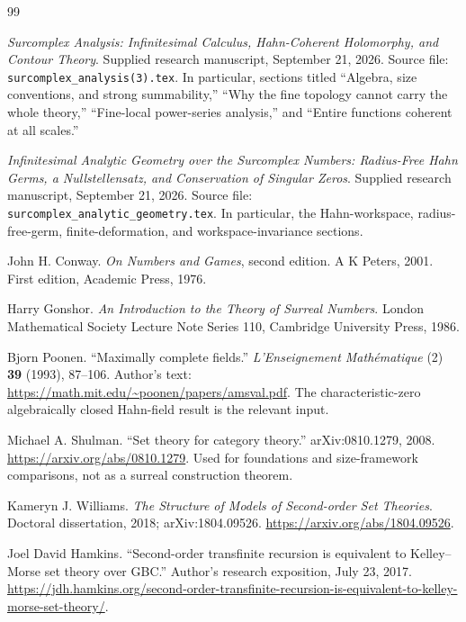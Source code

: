 \documentclass[11pt,letterpaper]{article}
\theoremstyle{definition}
\theoremstyle{remark}
\numberwithin{equation}{section}
\begin{document}
\begin{thebibliography}{99}

\emph{Surcomplex Analysis: Infinitesimal Calculus, Hahn-Coherent Holomorphy, and Contour Theory}.
Supplied research manuscript, September 21, 2026.
Source file: \texttt{surcomplex\_analysis(3).tex}. In particular, sections titled ``Algebra, size conventions, and strong summability,'' ``Why the fine topology cannot carry the whole theory,'' ``Fine-local power-series analysis,'' and ``Entire functions coherent at all scales.''

\emph{Infinitesimal Analytic Geometry over the Surcomplex Numbers: Radius-Free Hahn Germs, a Nullstellensatz, and Conservation of Singular Zeros}.
Supplied research manuscript, September 21, 2026.
Source file: \texttt{surcomplex\_analytic\_geometry.tex}. In particular, the Hahn-workspace, radius-free-germ, finite-deformation, and workspace-invariance sections.

John H. Conway. \emph{On Numbers and Games}, second edition. A K Peters, 2001. First edition, Academic Press, 1976.

Harry Gonshor. \emph{An Introduction to the Theory of Surreal Numbers}.
London Mathematical Society Lecture Note Series 110, Cambridge University Press, 1986.

Bjorn Poonen. ``Maximally complete fields.'' \emph{L'Enseignement Math\'ematique} (2) \textbf{39} (1993), 87--106.
Author's text: \url{https://math.mit.edu/~poonen/papers/amsval.pdf}.
The characteristic-zero algebraically closed Hahn-field result is the relevant input.

Michael A. Shulman. ``Set theory for category theory.'' arXiv:0810.1279, 2008.
\url{https://arxiv.org/abs/0810.1279}.
Used for foundations and size-framework comparisons, not as a surreal construction theorem.

Kameryn J. Williams. \emph{The Structure of Models of Second-order Set Theories}.
Doctoral dissertation, 2018; arXiv:1804.09526.
\url{https://arxiv.org/abs/1804.09526}.

Joel David Hamkins. ``Second-order transfinite recursion is equivalent to Kelley--Morse set theory over GBC.'' Author's research exposition, July 23, 2017.
\url{https://jdh.hamkins.org/second-order-transfinite-recursion-is-equivalent-to-kelley-morse-set-theory/}.


\end{thebibliography}
\end{document}
